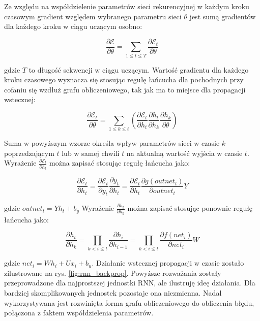 \documentclass[oneside, mag]{mgr}
\begin{document}
Ze względu na współdzielenie parametrów sieci rekurencyjnej w każdym kroku czasowym gradient względem wybranego parametru sieci $\theta$ jest sumą gradientów dla każdego kroku w ciągu uczącym osobno:

\begin{equation}
	\frac{\partial \mathcal{E}}{\partial \theta} = \sum_{1 \leq t \leq T} \frac{\partial \mathcal{E}_t}{\partial \theta}
\end{equation}

gdzie $T$ to długość sekwencji w ciągu uczącym. Wartość gradientu dla każdego kroku czasowego wyznacza się stosując regułę łańcucha dla pochodnych przy cofaniu się wzdłuż grafu obliczeniowego, tak jak ma to miejsce dla propagacji wstecznej:

\begin{equation}
	\frac{\partial \mathcal{E}_t}{\partial \theta} = \sum_{1 \leq k \leq t} (\frac{\partial \mathcal{E}_t}{\partial h_t} \frac{\partial h_t}{\partial h_k} \frac{\partial h_k}{\partial \theta})
\end{equation}

Suma w powyższym wzorze określa wpływ parametrów sieci w czasie $k$ poprzedzającym $t$ lub w samej chwili $t$ na aktualną wartość wyjścia w czasie $t$. Wyrażenie $\frac{\partial \mathcal{E}_t}{\partial h_t}$ można zapisać stosując regułę łańcucha jako:

\begin{equation}
	\frac{\partial \mathcal{E}_t}{\partial h_t} = \frac{\partial \mathcal{E}_t}{\partial y_t} \frac{\partial y_t}{\partial h_t} = \frac{\partial \mathcal{E}_t}{\partial h_t} \frac{\partial g(outnet_t)}{\partial outnet_t} Y
\end{equation}

gdzie $outnet_t = Y h_t + b_y$ Wyrażenie $\frac{\partial h_t}{\partial h_k}$ można zapisać stosując ponownie regułę łańcucha jako:

\begin{equation}
	\frac{\partial h_t}{\partial h_k} = \prod_{k < i \leq t} \frac{\partial h_i}{\partial h_{i-1}} = \prod_{k < i \leq t} \frac{\partial f(net_i)}{\partial net_i} W
\label{eq:BPTT_product}
\end{equation}

gdzie $net_i = W h_i + U x_i + b_u$. Działanie wstecznej propagacji w czasie zostało zilustrowane na rys. \ref{fig:rnn_backprop}. Powyższe rozważania zostały przeprowadzone dla najprostszej jednostki RNN, ale ilustruję ideę działania. Dla bardziej skomplikowanych jednostek pozostaje ona niezmienna. Nadal wykorzystywana jest rozwinięta forma grafu obliczeniowego do obliczenia błędu, połączona z faktem współdzielenia parametrów. 
\end{document}
